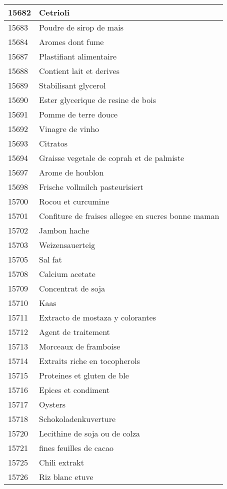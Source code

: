 \begin{longtable}{|l|l|}
15682 & Cetrioli \\ \hline 
15683 & Poudre de sirop de mais \\ \hline 
15684 & Aromes dont fume \\ \hline 
15687 & Plastifiant alimentaire \\ \hline 
15688 & Contient lait et derives \\ \hline 
15689 & Stabilisant glycerol \\ \hline 
15690 & Ester glycerique de resine de bois \\ \hline 
15691 & Pomme de terre douce \\ \hline 
15692 & Vinagre de vinho \\ \hline 
15693 & Citratos \\ \hline 
15694 & Graisse vegetale de coprah et de palmiste \\ \hline 
15697 & Arome de houblon \\ \hline 
15698 & Frische vollmilch pasteurisiert \\ \hline 
15700 & Rocou et curcumine \\ \hline 
15701 & Confiture de fraises allegee en sucres bonne maman \\ \hline 
15702 & Jambon hache \\ \hline 
15703 & Weizensauerteig \\ \hline 
15705 & Sal fat \\ \hline 
15708 & Calcium acetate \\ \hline 
15709 & Concentrat de soja \\ \hline 
15710 & Kaas \\ \hline 
15711 & Extracto de mostaza y colorantes \\ \hline 
15712 & Agent de traitement \\ \hline 
15713 & Morceaux de framboise \\ \hline 
15714 & Extraits riche en tocopherols \\ \hline 
15715 & Proteines et gluten de ble \\ \hline 
15716 & Epices et condiment \\ \hline 
15717 & Oysters \\ \hline 
15718 & Schokoladenkuverture \\ \hline 
15720 & Lecithine de soja ou de colza \\ \hline 
15721 & fines feuilles de cacao \\ \hline 
15725 & Chili extrakt \\ \hline 
15726 & Riz blanc etuve \\ \hline 

\end{longtable}
